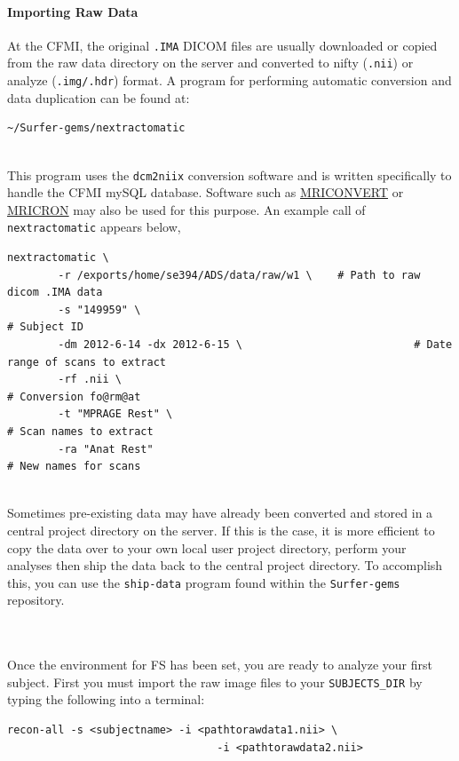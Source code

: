 \documentclass[paper=a4, fontsize=11pt]{scrartcl} %
\numberwithin{equation}{section} %
\numberwithin{figure}{section} %
\numberwithin{table}{section} %
\begin{document}
\paragraph{Importing Raw Data} At the CFMI, the original \texttt{.IMA} DICOM files are usually downloaded or copied from the raw data directory on the server and converted to nifty (\texttt{.nii}) or analyze (\texttt{.img/.hdr}) format.  A program for performing automatic conversion and data duplication can be found at:
\begin{lstlisting}
~/Surfer-gems/nextractomatic
\end{lstlisting}
~\\This program uses the \texttt{dcm2niix} conversion software and is written specifically to handle the CFMI mySQL database. Software such as \href{http://neuro.debian.net/pkgs/mriconvert.html}{MRICONVERT} or \href{http://www.mccauslandcenter.sc.edu/mricro/mricron/}{MRICRON} may also be used for this purpose.  An example call of \texttt{nextractomatic} appears below,

\begin{lstlisting}
nextractomatic \
		-r /exports/home/se394/ADS/data/raw/w1 \	# Path to raw dicom .IMA data
		-s "149959" \															# Subject ID
		-dm 2012-6-14 -dx 2012-6-15 \							# Date range of scans to extract
		-rf .nii \																# Conversion fo@rm@at
		-t "MPRAGE Rest" \ 												# Scan names to extract
		-ra "Anat Rest"														# New names for scans
\end{lstlisting}

~\\Sometimes pre-existing data may have already been converted and stored in a central project directory on the server.  If this is the case, it is more efficient to copy the data over to your own local user project directory, perform your analyses then ship the data back to the central project directory.  To accomplish this, you can use the \texttt{ship-data} program found within the \texttt{Surfer-gems} repository.

~\\ \\ Once the environment for FS has been set, you are ready to analyze your first subject.  First you must import the raw image files to your \texttt{SUBJECTS\_DIR} by typing the following into a terminal: \newpage
\begin{lstlisting}[frame=single, xrightmargin=0cm]
recon-all -s <subjectname> -i <pathtorawdata1.nii> \
			                     -i <pathtorawdata2.nii>
\end{lstlisting}
\end{document}
